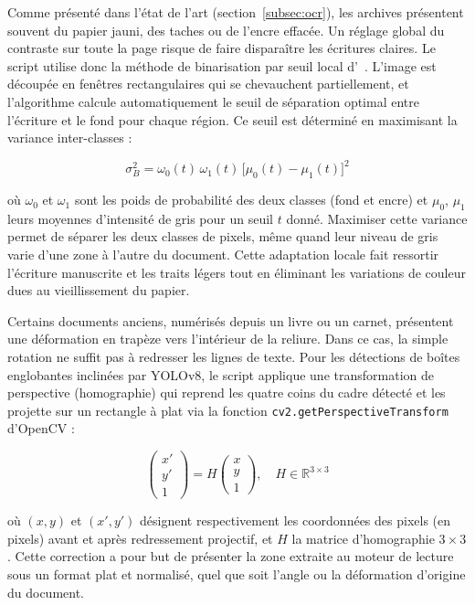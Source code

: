 Comme présenté dans l'état de l'art (section~\ref{subsec:ocr}), les archives présentent souvent du papier jauni, des taches ou de l'encre effacée. Un réglage global du contraste sur toute la page risque de faire disparaître les écritures claires. Le script utilise donc la méthode de binarisation par seuil local d'~\citet{otsu_threshold_1979}. L'image est découpée en fenêtres rectangulaires qui se chevauchent partiellement, et l'algorithme calcule automatiquement le seuil de séparation optimal entre l'écriture et le fond pour chaque région. Ce seuil est déterminé en maximisant la variance inter-classes :

\begin{equation}
  \sigma_B^2 = \omega_0(t)\,\omega_1(t)\,\bigl[\mu_0(t) - \mu_1(t)\bigr]^2
\end{equation}

où $\omega_0$ et $\omega_1$ sont les poids de probabilité des deux classes (fond et encre) et $\mu_0$, $\mu_1$ leurs moyennes d'intensité de gris pour un seuil $t$ donné. Maximiser cette variance permet de séparer les deux classes de pixels, même quand leur niveau de gris varie d'une zone à l'autre du document. Cette adaptation locale fait ressortir l'écriture manuscrite et les traits légers tout en éliminant les variations de couleur dues au vieillissement du papier.

Certains documents anciens, numérisés depuis un livre ou un carnet, présentent une déformation en trapèze vers l'intérieur de la reliure. Dans ce cas, la simple rotation ne suffit pas à redresser les lignes de texte. Pour les détections de boîtes englobantes inclinées par YOLOv8, le script applique une transformation de perspective (homographie) qui reprend les quatre coins du cadre détecté et les projette sur un rectangle à plat via la fonction \texttt{cv2.getPerspectiveTransform} d'OpenCV :

\begin{equation}
  \begin{pmatrix} x' \\ y' \\ 1 \end{pmatrix} = H \begin{pmatrix} x \\ y \\ 1 \end{pmatrix}, \quad H \in \mathbb{R}^{3\times3}
\end{equation}

où $(x, y)$ et $(x', y')$ désignent respectivement les coordonnées des pixels (en pixels) avant et après redressement projectif, et $H$ la matrice d'homographie $3 \times 3$. Cette correction a pour but de présenter la zone extraite au moteur de lecture sous un format plat et normalisé, quel que soit l'angle ou la déformation d'origine du document.

